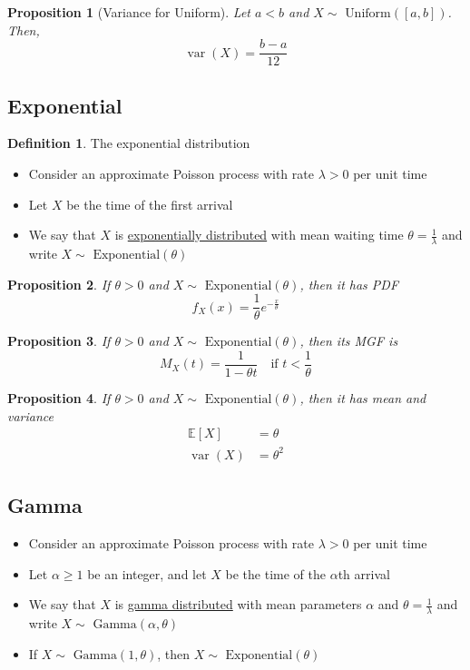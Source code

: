 \documentclass[
]{article}
\newtheorem{proposition}{Proposition}[section]
\theoremstyle{definition}
\newtheorem{definition}{Definition}[section]
\theoremstyle{definition}
\theoremstyle{definition}
\theoremstyle{remark}
\newcommand{\fxx}{f_X(x)}
\newcommand{\mx}[1]{M_X(#1)}
\newcommand{\E}[1]{\mathbb{E}[#1]}
\newcommand{\varx}{\operatorname{var}(X)}
\newcommand{\gmma}[1]{\sim\text{ Gamma}\left( #1 \right)}
\newcommand{\unif}[1]{\sim\text{ Uniform}\left(\left[ #1 \right]\right)}
\newcommand{\expn}[1]{\sim\text{ Exponential}\left( #1 \right)}
\begin{document}
\begin{proposition}[Variance for Uniform]
  Let $a<b$ and $X\unif{a,b}$. Then,
  \[\varx=\frac{b-a}{12}\]
\end{proposition}

\subsection{Exponential}

\begin{definition}
  The exponential distribution
  \begin{itemize}
    \item Consider an approximate Poisson process with rate $\lambda>0$ per unit time
    \item Let $X$ be the time of the first arrival
    \item We say that $X$ is \underline{exponentially distributed} with mean waiting time $\theta = \frac{1}{\lambda}$ and write $X\expn{\theta}$
  \end{itemize}
\end{definition}

\begin{proposition}
  If $\theta>0$ and $X\expn{\theta}$, then it has PDF
  \[\fxx=\frac{1}{\theta}e^{-\frac{x}{\theta}}\]
\end{proposition}

\begin{proposition}
  If $\theta>0$ and $X\expn{\theta}$, then its MGF is
  \[\mx{t}=\frac{1}{1-\theta t}\quad\text{if }t<\frac{1}{\theta}\]
\end{proposition}

\begin{proposition}
  If $\theta>0$ and $X\expn{\theta}$, then it has mean and variance
  \begin{align*}
    \E{X} & =\theta   \\
    \varx & =\theta^2
  \end{align*}
\end{proposition}

\subsection{Gamma}

\begin{itemize}
  \item Consider an approximate Poisson process with rate $\lambda>0$ per unit time
  \item Let $\alpha\geq 1$ be an integer, and let $X$ be the time of the $\alpha$th arrival
  \item We say that $X$ is \underline{gamma distributed} with mean parameters $\alpha$ and $\theta=\frac{1}{\lambda}$ and write $X\gmma{\alpha,\theta}$
  \item If $X\gmma{1,\theta}$, then $X\expn{\theta}$
\end{itemize}
\end{document}
